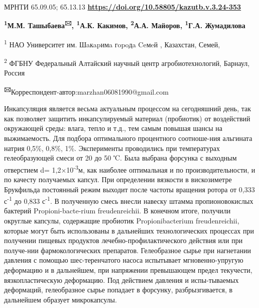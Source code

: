 \newpage
МРНТИ 65.09.05; 65.13.13
\hfill {\bfseries \href{https://doi.org/10.58805/kazutb.v.3.24-353}{https://doi.org/10.58805/kazutb.v.3.24-353}}


\begin{center}

{\bfseries \textsuperscript{1}М.М. Ташыбаева\textsuperscript{🖂},
\textsuperscript{1}А.К. Какимов, \textsuperscript{2}А.А. Майоров,
\textsuperscript{1}Г.А. Жумадилова}

\textsuperscript{1} НАО Университет им. Шaкapимa гopoдa Ceмeй ,
Казахстан, Семей,

\textsuperscript{2} ФГБНУ Федеральный Алтайский научный центр
агробиотехнологий, Барнаул, Россия
\end{center}
{\bfseries \textsuperscript{🖂}}Корреспондент-автор:marzhan06081990@gmail.com \vspace{0.5cm}


Инкапсуляция является весьма актуальным процессом на сегодняшний день,
так как позволяет защитить инкапсулируемый материал (пробиотик) от
воздействий окружающей среды: влага, тепло и т.д., тем самым повышая
шансы на выжимаемость. Для подбора оптимального процентного соотноше-ния
альгината натрия 0,5\%, 0,8\%, 1\%. Эксперименты проводились при
температурах гелеобразующей смеси от 20 до 50 ℃. Была выбрана форсунка с
выходным отверстием d= 1,2×10\textsuperscript{-3}м, как наиболее
оптимальная и по производительности, и по качесту получаемых капсул. При
определении вязкости в вискозиметре Брукфильда постоянный режим выходит
после частоты вращения ротора от 0,333 с\textsuperscript{-1} до 0,833
с\textsuperscript{-1}. В полученную смесь внесли навеску штамма
пропионовокислых бактерий Propioni-bacte-rium freudenreichii. В конечном
итоге, получили округлые капсулы, содержащие пробиотик Propionibacterium
freudenreichii, которые могут быть использованы в дальнейших
технологических процессах при получении пищевых продуктов
лечебно-профилактического действия или при получе-нии фармокологических
препаратов. Гелеобразное сырье при нагнетании давления с помощью
шес-теренчатого насоса испытывает мгновенно-упругую деформацию и в
дальнейшем, при напряжении превышающем предел текучести,
вязкопластическую деформацию. Под действием давления и испы-тываемых
деформаций, гелеобразное сырье попадает в форсунку, разбрызгивается, в
дальнейшем образует микрокапсулы.

